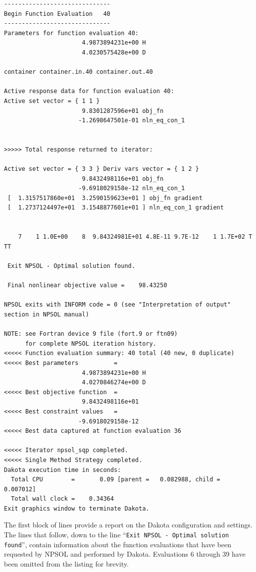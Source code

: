 \begin{small}
\begin{verbatim}
------------------------------
Begin Function Evaluation   40
------------------------------
Parameters for function evaluation 40:
                      4.9873894231e+00 H
                      4.0230575428e+00 D

container container.in.40 container.out.40

Active response data for function evaluation 40:
Active set vector = { 1 1 }
                      9.8301287596e+01 obj_fn
                     -1.2698647501e-01 nln_eq_con_1


>>>>> Total response returned to iterator:

Active set vector = { 3 3 } Deriv vars vector = { 1 2 }
                      9.8432498116e+01 obj_fn
                     -9.6918029158e-12 nln_eq_con_1
 [  1.3157517860e+01  3.2590159623e+01 ] obj_fn gradient
 [  1.2737124497e+01  3.1548877601e+01 ] nln_eq_con_1 gradient


    7    1 1.0E+00    8  9.84324981E+01 4.8E-11 9.7E-12    1 1.7E+02 T TT     

 Exit NPSOL - Optimal solution found.

 Final nonlinear objective value =    98.43250    

NPSOL exits with INFORM code = 0 (see "Interpretation of output" section in NPSOL manual)

NOTE: see Fortran device 9 file (fort.9 or ftn09)
      for complete NPSOL iteration history.
<<<<< Function evaluation summary: 40 total (40 new, 0 duplicate)
<<<<< Best parameters          =
                      4.9873894231e+00 H
                      4.0270846274e+00 D
<<<<< Best objective function  =
                      9.8432498116e+01
<<<<< Best constraint values   =
                     -9.6918029158e-12
<<<<< Best data captured at function evaluation 36

<<<<< Iterator npsol_sqp completed.
<<<<< Single Method Strategy completed.
Dakota execution time in seconds:
  Total CPU        =       0.09 [parent =   0.082988, child =   0.007012]
  Total wall clock =    0.34364
Exit graphics window to terminate Dakota.
\end{verbatim}
\end{small}

The first block of lines provide a report on the Dakota configuration
and settings. The lines that follow, down to the line 
``\texttt{Exit  NPSOL - Optimal solution found}'', contain information
about the function evaluations that have been requested by NPSOL and
performed by Dakota. Evaluations 6 through 39 have been omitted from
the listing for brevity.

